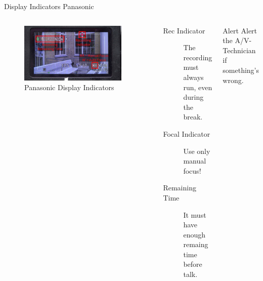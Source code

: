 \begin{frame}{Display Indicators Panasonic}
	\begin{columns}[T,onlytextwidth]
	\begin{figure}
		\centering
		\includegraphics[width=0.9\textwidth]{images/panasonic-display-annotated.jpg}
		\caption{Panasonic Display Indicators}
	\end{figure}
		\begin{description}
			\item[Rec Indicator] The recording must always run, even during the break.
			\item[Focal Indicator] Use only manual focus!
			\item[Remaining Time] It must have enough remaing time before talk.
		\end{description}
		\begin{alertblock}{Alert}
			Alert the A/V-Technician if something's wrong.
		\end{alertblock}
	\end{columns}
\end{frame}
